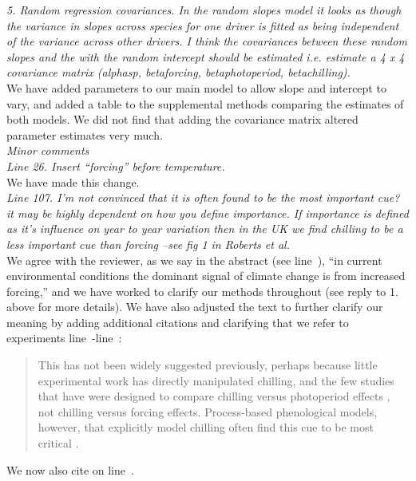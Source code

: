 \documentclass[11pt, a4paper]{article}
\newcommand{\lr}[1]{line~\lineref{#1}}
\begin{document}
\emph{5. Random regression covariances. In the random slopes model it looks as though the variance in
slopes across species for one driver is fitted as being independent of the variance across other
drivers. I think the covariances between these random slopes and the with the random
intercept should be estimated i.e. estimate a 4 x 4 covariance matrix (alphasp, betaforcing,
betaphotoperiod, betachilling).}\\

We have added parameters to our main model to allow slope and intercept to vary, and added a table to the supplemental methods comparing the estimates of both models. We did not find that adding the covariance matrix altered parameter estimates very much.\\

\emph{Minor comments}\\

\emph{Line 26. Insert ``forcing'' before temperature.}\\

We have made this change.\\ %

\emph{Line 107. I'm not convinced that it is often found to be the most important cue? it may be highly
dependent on how you define importance. If importance is defined as it's influence on year to year
variation then in the UK we find chilling to be a less important cue than forcing --see fig 1 in Roberts et
al.}\\

We agree with the reviewer, as we say in the abstract (see \lr{unifydebateend}), ``in current environmental conditions the dominant signal of climate change is from increased forcing,'' and we have worked to clarify our methods throughout (see reply to 1. above for more details). We have also adjusted the text to further clarify our meaning by adding additional citations and clarifying that we refer to experiments \lr{eeXstart}-\lr{eeXend}:
\begin{quote}
This has not been widely suggested previously, perhaps because little experimental work has directly manipulated chilling, and the few studies that have were designed to compare chilling versus photoperiod effects \emph{\citep[e.g.,][]{zohner2016,Basler:2014aa,Caffarra:2011qf,Laube:2014a}}, not chilling versus forcing effects. Process-based phenological models, however, that explicitly model chilling often find this cue to be most critical \emph{\citep[e.g.,][]{gauzere2019,Laube:2014a,Heide:2005aa}}.
\end{quote}
We now also cite \citet{roberts2015} on \lr{addedroberts}.\\
\end{document}
